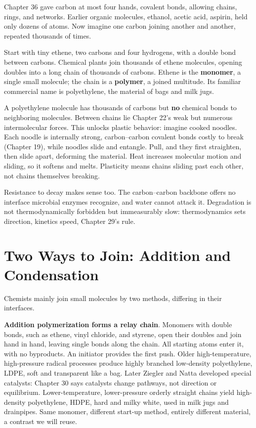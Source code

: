 Chapter 36 gave carbon at most four hands, covalent bonds, allowing chains, rings, and networks. Earlier organic molecules, ethanol, acetic acid, aspirin, held only dozens of atoms. Now imagine one carbon joining another and another, repeated thousands of times.

Start with tiny ethene, two carbons and four hydrogens, with a double bond between carbons. Chemical plants join thousands of ethene molecules, opening doubles into a long chain of thousands of carbons. Ethene is the \textbf{monomer}, a single small molecule; the chain is a \textbf{polymer}, a joined multitude. Its familiar commercial name is polyethylene, the material of bags and milk jugs.

A polyethylene molecule has thousands of carbons but \textbf{no} chemical bonds to neighboring molecules. Between chains lie Chapter 22's weak but numerous intermolecular forces. This unlocks plastic behavior: imagine cooked noodles. Each noodle is internally strong, carbon--carbon covalent bonds costly to break (Chapter 19), while noodles slide and entangle. Pull, and they first straighten, then slide apart, deforming the material. Heat increases molecular motion and sliding, so it softens and melts. Plasticity means chains sliding past each other, not chains themselves breaking.

Resistance to decay makes sense too. The carbon--carbon backbone offers no interface microbial enzymes recognize, and water cannot attack it. Degradation is not thermodynamically forbidden but immeasurably slow: thermodynamics sets direction, kinetics speed, Chapter 29's rule.

\section{Two Ways to Join: Addition and Condensation}

Chemists mainly join small molecules by two methods, differing in their interfaces.

\textbf{Addition polymerization forms a relay chain}. Monomers with double bonds, such as ethene, vinyl chloride, and styrene, open their doubles and join hand in hand, leaving single bonds along the chain. All starting atoms enter it, with no byproducts. An initiator provides the first push. Older high-temperature, high-pressure radical processes produce highly branched low-density polyethylene, LDPE, soft and transparent like a bag. Later Ziegler and Natta developed special catalysts: Chapter 30 says catalysts change pathways, not direction or equilibrium. Lower-temperature, lower-pressure orderly straight chains yield high-density polyethylene, HDPE, hard and milky white, used in milk jugs and drainpipes. Same monomer, different start-up method, entirely different material, a contrast we will reuse.

